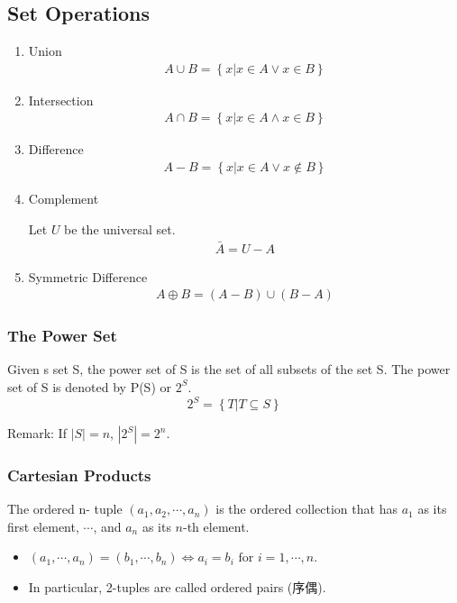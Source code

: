 \subsection{Set Operations}
\begin{enumerate}
    \item Union
    \begin{align*}
        A \cup B = \left\{ x | x \in A \lor x \in B  \right\}
    \end{align*}
    \item Intersection
    \begin{align*}
        A \cap  B = \left\{ x | x \in A \land x \in B  \right\}
    \end{align*}
    \item Difference
    \begin{align*}
        A-B = \left\{ x| x\in A \lor x \notin B \right\}
    \end{align*}
    \item Complement
    
    Let $U$ be the universal set. 
    \begin{align*}
        \bar{A}=U-A
    \end{align*}
    \item Symmetric Difference
    \begin{align*}
        A \oplus B =(A-B)\cup (B-A)
    \end{align*}
\end{enumerate}

\subsubsection{The Power Set}
\begin{definition}
    Given s set S, \textcolor{light_red}{the power set} of S is the set of all subsets of the set S. The power set of S is denoted by P(S) or $2^S$.
    \[ 2^S = \left\{ T | T \subseteq S  \right\} \]
\end{definition}

Remark: If $|S|=n$, $|2^S|=2^n$. 
\subsubsection{Cartesian Products}
\begin{definition}
    \textcolor{light_red}{The ordered n- tuple} $(a_1,a_2,\cdots,a_n)$ is the ordered collection that has $a_1$ as its first element, $\cdots$, and $a_n$ as its $n$-th element. 
\end{definition}
\begin{itemize}
    \item $(a_1,\cdots, a_n)=(b_1,\cdots,b_n)\Longleftrightarrow a_i=b_i \text{ for } i=1,\cdots, n$.
    \item In particular, 2-tuples are called ordered pairs (序偶). 
\end{itemize}

